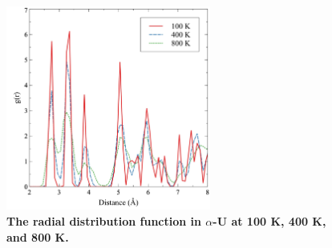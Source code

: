 \documentclass[utf8]{frontiersSCNS} %
\providecommand{\DIFaddtex}[1]{{\bf #1}} %
\providecommand{\DIFaddbegin}{\protect\color{blue}} %
\providecommand{\DIFaddFL}[1]{\DIFadd{#1}} %
\providecommand{\DIFadd}[1]{\texorpdfstring{\DIFaddtex{#1}}{#1}} %
\begin{document}
 \DIFaddbegin \begin{figure}[hbt]
	\centering
	\includegraphics[width=0.6\textwidth]{rdfs.jpg}
  \caption{\DIFaddFL{The radial distribution function in $\alpha$-U at 100 K, 400 K, and 800 K. }}\label{fig:rdf}
\end{figure}
\end{document}
